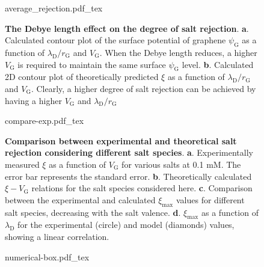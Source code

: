 \begin{figure}[H]
  \centering
  {average_rejection.pdf_tex}
  \caption{\textbf{The Debye length effect on the degree of salt
      rejection}. \textbf{a}. Calculated contour plot of the surface
    potential of graphene $\psi_{\mathrm{G}}$ as a function of
    $\lambda_{\mathrm{D}}/r_{\mathrm{G}}$ and $V_{\mathrm{G}}$. When
    the Debye length reduces, a higher $V_{\mathrm{G}}$ is required to
    maintain the same surface $\psi_{\mathrm{G}}$
    level. \textbf{b}. Calculated 2D contour plot of theoretically
    predicted $\xi$ as a function of
    $\lambda_{\mathrm{D}}/r_{\mathrm{G}}$ and
    $V_{\mathrm{G}}$. Clearly, a higher degree of salt rejection can
    be achieved by having a higher $V_{\mathrm{G}}$ and
    $\lambda_{\mathrm{D}}/r_{\mathrm{G}}$}
  \label{fig:np-5}
\end{figure}

\begin{figure}[H]
  \centering
  {compare-exp.pdf_tex}
  \caption{\textbf{Comparison between experimental and theoretical
      salt rejection considering different salt
      species}. \textbf{a}. Experimentally measured $\xi$ as a
    function of $V_{\mathrm{G}}$ for various salts at 0.1 mM. The
    error bar represents the standard error. \textbf{b}. Theoretically
    calculated $\xi-V_{\mathrm{G}}$ relations for the salt species
    considered here. \textbf{c}. Comparison between the experimental
    and calculated $\xi_{\mathrm{max}}$ values for different salt
    species, decreasing with the salt
    valence. \textbf{d}. $\xi_{\mathrm{max}}$ as a function of
    $\lambda_{\mathrm{D}}$ for the experimental (circle) and model
    (diamonds) values, showing a linear correlation.}
  \label{fig:np-6}
\end{figure}


\begin{figure}[!htbp]
  \centering
  {numerical-box.pdf_tex}
  \caption{\label{fig:nanopore-simu-box}}
\end{figure}




